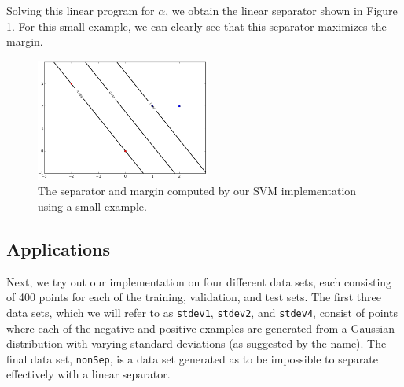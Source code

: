 \documentclass{sigchi}
\begin{document}
\large
Solving this linear program for $\alpha$, we obtain the linear separator shown in Figure 1. For this small example, we can clearly see that this separator maximizes the margin.

\begin{figure}
\centering
\includegraphics[width=2.25in]{plots/1-3/casey/simple.png}
\caption{The separator and margin computed by our SVM implementation using a small example.}
\end{figure}

\subsection{Applications}

Next, we try out our implementation on four different data sets, each consisting of 400 points for each of the training, validation, and test sets. The first three data sets, which we will refer to as \texttt{stdev1}, \texttt{stdev2}, and \texttt{stdev4}, consist of points where each of the negative and positive examples are generated from a Gaussian distribution with varying standard deviations (as suggested by the name). The final data set, \texttt{nonSep}, is a data set generated as to be impossible to separate effectively with a linear separator.
\end{document}
